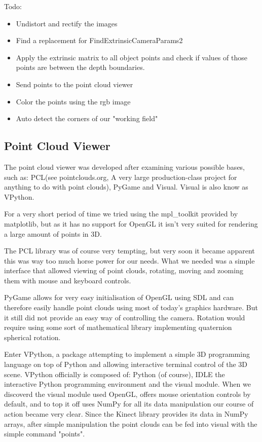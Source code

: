 Todo: 

\begin{itemize}

\item Undistort and rectify the images%

\item Find a replacement for FindExtrinsicCameraParams2%

\item Apply the extrinsic matrix to all object points and check if values of those points are between the depth boundaries.%

\item Send points to the point cloud viewer%

\item Color the points using the rgb image%

\item Auto detect the corners of our "working field"%

\end{itemize}

\subsection{Point Cloud Viewer}

The point cloud viewer was developed after examining various possible
bases, such as: PCL(see pointclouds.org, A very large production-class project for
anything to do with point clouds), PyGame and Visual. Visual is also know
as VPython.

For a very short period of time we tried using the mpl\_toolkit provided
by matplotlib, but as it has no support for OpenGL it isn't very suited
for rendering a large amount of points in 3D.

The PCL library was of course
very tempting, but very soon it became apparent this was way too much horse
power for our needs. What we needed was a simple interface that allowed viewing
of point clouds, rotating, moving and zooming them with mouse and keyboard
controls.

PyGame allows for very easy initialisation of OpenGL using SDL and can therefore
easily handle point clouds using most of today's graphics hardware. But it still
did not provide an easy way of controlling the camera. Rotation would require
using some sort of mathematical library implementing quaternion spherical rotation.

Enter VPython, a package attempting to implement a simple 3D programming
language on top of Python and allowing interactive terminal control of the
3D scene. VPython officially is composed of: Python (of course), IDLE the
interactive Python programming environment and the visual module. When we
discoverd the visual module used OpenGL, offers mouse orientation
controls by default, and to top it off uses NumPy for all its data manipulation
our course of action became very clear. Since the Kinect library provides its
data in NumPy arrays, after simple manipulation the point clouds can be fed into
visual with the simple command "points".

